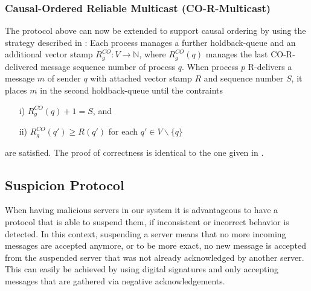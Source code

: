 \documentclass[runningheads]{llncs}
\begin{document}
\subsubsection{Causal-Ordered Reliable Multicast (CO-R-Multicast)}
The protocol above can now be extended to support causal ordering by using the strategy described in \cite[p.~657-658]{ds_book}: Each process manages a further holdback-queue and an additional vector stamp $R_g^{CO}: V \rightarrow \mathbb{N}$, where $R_g^{CO}(q)$ manages the last CO-R-delivered message sequence number of process $q$. When process $p$ R-delivers a message $m$ of sender $q$ with attached vector stamp $R$ and sequence number $S$, it places $m$ in the second holdback-queue until the contraints
\begin{enumerate}
    \item[i)] $R_g^{CO}(q) + 1 = S$, and 
    \item[ii)] $R_g^{CO}(q') \geq R(q')$ for each $q' \in V \backslash \{q\}$
\end{enumerate}
are satisfied. The proof of correctness is identical to the one given in \cite[p.~658]{ds_book}.

\subsection{Suspicion Protocol}
When having malicious servers in our system it is advantageous to have a protocol that is able to suspend them, if inconsistent or incorrect behavior is detected. In this context, suspending a server means that no more incoming messages are accepted anymore, or to be more exact, no new message is accepted from the suspended server that was not already acknowledged by another server. This can easily be achieved by using digital signatures and only accepting messages that are gathered via negative acknowledgements. 
\end{document}
